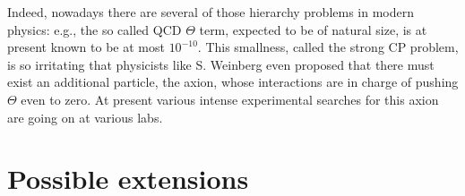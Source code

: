 \documentclass[12pt,ngerman,american]{iopart}
\begin{document}
Indeed, nowadays there are  several of those hierarchy problems in modern physics:
e.g., the so called QCD $\Theta$ term, expected to be of natural size, is at present known to be at most $10^{-10}$.
This smallness, called the strong CP problem, is so irritating that physicists like S. Weinberg even proposed that there must
exist an additional particle, the axion, whose interactions are in charge of pushing $\Theta$ even to zero.
At present various
intense experimental searches for this axion are going on at various labs.


\section{Possible extensions}\label{sec:extensions}
\end{document}
